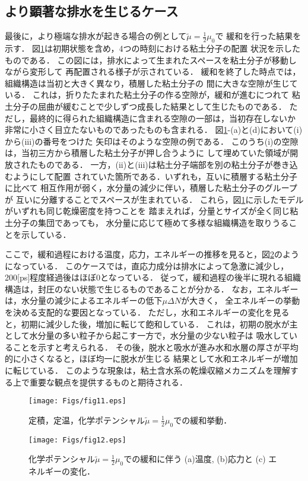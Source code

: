 \subsection{より顕著な排水を生じるケース}
最後に，より極端な排水が起きる場合の例として$\tilde \mu =\frac{1}{2}\mu_0$で
緩和を行った結果を示す．
図\ref{fig:fig11}は初期状態を含め，4つの時刻における粘土分子の配置
状況を示したものである．
この図には，排水によって生まれたスペースを粘土分子が移動しながら変形して
再配置される様子が示されている．
緩和を終了した時点では，組織構造は当初と大きく異なり，積層した粘土分子の
間に大きな空隙が生じている．
これは，折りたたまれた粘土分子の作る空隙が，緩和が進むにつれて
粘土分子の屈曲が緩むことで少しずつ成長した結果として生じたものである．
ただし，最終的に得られた組織構造に含まれる空隙の一部は，当初存在しないか
非常に小さく目立たないものであったものも含まれる．
図\ref{fig:fig11}-(a)と(d)において(i)から(iii)の番号をつけた
矢印はそのような空隙の例である．
このうち(i)の空隙は，当初三方から積層した粘土分子が押し合うように
して埋めていた領域が開放されたものである．
一方，(ii)と(iii)は粘土分子端部を別の粘土分子が巻き込むようにして配置
されていた箇所である．いずれも，互いに積層する粘土分子に比べて
相互作用が弱く，水分量の減少に伴い，積層した粘土分子のグループが
互いに分離することでスペースが生まれている．
これら，図\ref{fig:fig11}に示したモデルがいずれも同じ乾燥密度を持つことを
踏まえれば，分量とサイズが全く同じ粘土分子の集団であっても，
水分量に応じて極めて多様な組織構造を取りうることを示している．

ここで，緩和過程における温度，応力，エネルギーの推移を見ると，図\ref{fig:fig12}のようになっている．
このケースでは，直応力成分は排水によって急激に減少し，200[ps]程度経過後はほぼ0となっている．
従って，緩和過程の後半に現れる組織構造は，封圧のない状態で生じるものであることが分かる．
なお，エネルギーは，水分量の減少によるエネルギーの低下$\mu \Delta N$が大きく，
全エネルギーの挙動を決める支配的な要因となっている．
ただし，水和エネルギーの変化を見ると，初期に減少した後，増加に転じて飽和している．
これは，初期の脱水が主として水分量の多い粒子から起こす一方で，水分量の少ない粒子は
吸水していることを示すと考えられる．
その後，脱水と吸水が進み水和水層の厚さが平均的に小さくなると，ほぼ均一に脱水が生じる
結果として水和エネルギーが増加に転じている．
このような現象は，粘土含水系の乾燥収縮メカニズムを理解する上で重要な観点を提供するものと期待される．
\begin{figure}[h]
	\begin{center}
	\texttt{[image: Figs/fig11.eps]} 
	\end{center}
	\caption{
		定積，定温，化学ポテンシャル$\tilde \mu =\frac{1}{2}\mu_0$での緩和挙動．
	} 
	\label{fig:fig11}
\end{figure}
\begin{figure}[h]
	\begin{center}
	\texttt{[image: Figs/fig12.eps]} 
	\end{center}
	\caption{
		化学ポテンシャル$\tilde \mu =\frac{1}{2}\mu_0$での緩和に伴う
		(a)温度, (b)応力と (c) エネルギーの変化．
	} 
	\label{fig:fig12}
\end{figure}

